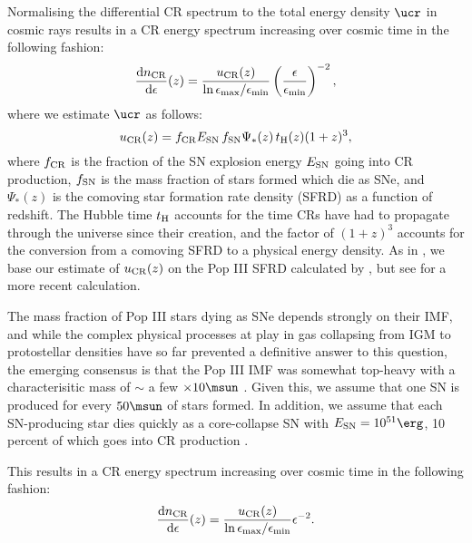 Normalising the differential CR spectrum to the total energy density $\ucr$ in cosmic rays results in a CR energy spectrum increasing over cosmic time in the following fashion:
 \begin{equation}
 \frac{{\rm d}n_{\rm \small CR}}{{\rm d}\epsilon}(z) = \frac{u_{\rm \small CR}(z)}{{\rm ln}\,\epsilon_{\rm max}{\large /}\epsilon_{\rm min}}  \left( \frac{\epsilon}{\epsilon_{\rm min}} \right)^{-2},
 \end{equation}
where we estimate $\ucr$ as follows:
\begin{equation}
u_{\rm \small CR}(z) = f_{\rm \small CR} E_{\rm \small SN}\, f_{\rm \small SN} \Psi_{*}(z)\, t_{\rm \small H}(z) (1+z)^3,
\end{equation}
where $f_{\rm \small CR}$ is the fraction of the SN explosion energy $E_{\rm \small SN}$ going into CR production, $f_{\rm \small SN}$ is the mass fraction of stars formed which die as SNe, and $\Psi_{*}(z)$ is the comoving star formation rate density (SFRD) as a function of redshift.  The Hubble time $t_{\rm \small H}$ accounts for the time CRs have had to propagate through the universe since their creation, and the factor of $(1+z)^3$ accounts for the conversion from a comoving SFRD to a physical energy density. As in \citet{Hummeletal2015}, we base our estimate of $u_{\rm \small CR}(z)$ on the Pop III SFRD calculated by \citet{GreifBromm2006}, but see \citet{Campisietal2011} for a more recent calculation.

 The mass fraction of Pop III stars dying as SNe depends strongly on their IMF, and while the complex physical processes at play in gas collapsing from IGM to protostellar densities have so far prevented a definitive answer to this question, the emerging consensus is that the Pop III IMF was somewhat top-heavy with a characterisitic mass of $\sim$ a few $\times 10\msun$ \citep{Bromm2013}.  Given this, we assume that one SN is produced for every $50\msun$ of stars formed.  In addition, we assume that each SN-producing star dies quickly as a core-collapse SN with $E_{\rm \small SN} = 10^{51}\erg$, 10 percent of which goes into CR production \citep[e.g.,][]{Ruderman1974}.
 
 This results in a CR energy spectrum increasing over cosmic time in the following fashion:
 \begin{equation}
 \frac{{\rm d}n_{\rm \small CR}}{{\rm d}\epsilon}(z) = \frac{u_{\rm \small CR}(z)}{{\rm ln}\,\epsilon_{\rm max}{\large /}\epsilon_{\rm min}}  \epsilon^{-2}.
 \end{equation}